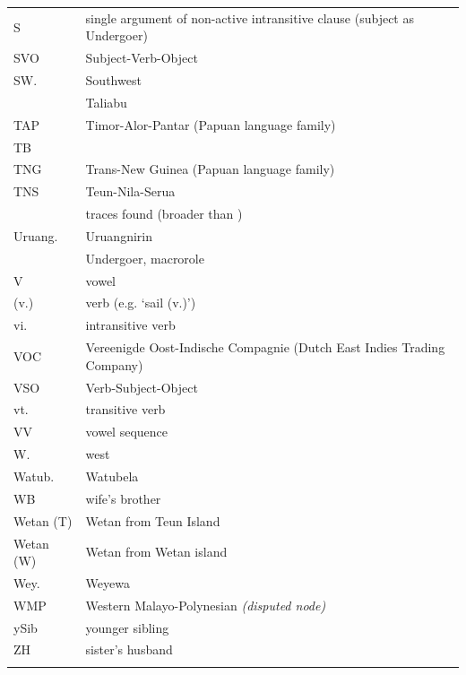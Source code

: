 {\begin{xltabular}{\textwidth}[l]{l>{\raggedright\arraybackslash}X}
S	&	single argument of non-active intransitive clause (subject as Undergoer)	\\
SVO	&	Subject-Verb-Object	\\
SW.	&	Southwest	\\
	&	Taliabu	\\
TAP	&	Timor-Alor-Pantar (Papuan language family)	\\
TB	&		\\
TNG	&	Trans-New Guinea (Papuan language family)	\\
TNS	&	Teun-Nila-Serua	\\
	&	traces found (broader than )	\\
Uruang.	&	Uruangnirin	\\
	&	Undergoer, macrorole	\\
V	&	vowel	\\
(v.)	&	verb (e.g. `sail (v.)')	\\
vi.	&	intransitive verb	\\
VOC	&	Vereenigde Oost-Indische Compagnie (Dutch East Indies Trading Company)	\\
VSO	&	Verb-Subject-Object	\\
vt.	&	transitive verb	\\
VV	&	vowel sequence	\\
W.	&	west	\\
Watub.	&	Watubela	\\
WB	&	wife’s brother	\\
Wetan (T)	&	Wetan from Teun Island	\\
Wetan (W)	&	Wetan from Wetan island	\\
Wey.	&	Weyewa	\\
WMP	&	Western Malayo-Polynesian \it{(disputed node)}	\\
ySib	&	younger sibling	\\
ZH	&	sister’s husband	\\
	\lspbottomrule
\end{xltabular}}